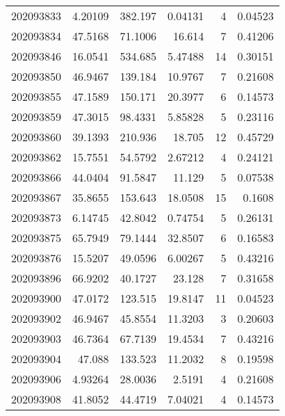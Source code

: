 \begin{tabular}{rrrrrr}
 202093833 &          4.20109 &      382.197  &            0.04131 &           4 & 0.04523 \\
 202093834 &         47.5168  &       71.1006 &           16.614   &           7 & 0.41206 \\
 202093846 &         16.0541  &      534.685  &            5.47488 &          14 & 0.30151 \\
 202093850 &         46.9467  &      139.184  &           10.9767  &           7 & 0.21608 \\
 202093855 &         47.1589  &      150.171  &           20.3977  &           6 & 0.14573 \\
 202093859 &         47.3015  &       98.4331 &            5.85828 &           5 & 0.23116 \\
 202093860 &         39.1393  &      210.936  &           18.705   &          12 & 0.45729 \\
 202093862 &         15.7551  &       54.5792 &            2.67212 &           4 & 0.24121 \\
 202093866 &         44.0404  &       91.5847 &           11.129   &           5 & 0.07538 \\
 202093867 &         35.8655  &      153.643  &           18.0508  &          15 & 0.1608  \\
 202093873 &          6.14745 &       42.8042 &            0.74754 &           5 & 0.26131 \\
 202093875 &         65.7949  &       79.1444 &           32.8507  &           6 & 0.16583 \\
 202093876 &         15.5207  &       49.0596 &            6.00267 &           5 & 0.43216 \\
 202093896 &         66.9202  &       40.1727 &           23.128   &           7 & 0.31658 \\
 202093900 &         47.0172  &      123.515  &           19.8147  &          11 & 0.04523 \\
 202093902 &         46.9467  &       45.8554 &           11.3203  &           3 & 0.20603 \\
 202093903 &         46.7364  &       67.7139 &           19.4534  &           7 & 0.43216 \\
 202093904 &         47.088   &      133.523  &           11.2032  &           8 & 0.19598 \\
 202093906 &          4.93264 &       28.0036 &            2.5191  &           4 & 0.21608 \\
 202093908 &         41.8052  &       44.4719 &            7.04021 &           4 & 0.14573 \\

\end{tabular}
